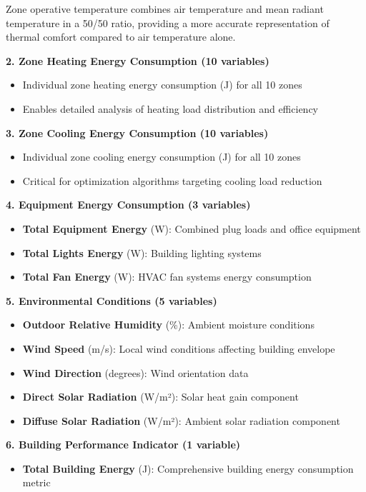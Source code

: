 \documentclass[12pt,a4paper]{article}
\begin{document}
Zone operative temperature combines air temperature and mean radiant temperature in a 50/50 ratio, providing a more accurate representation of thermal comfort compared to air temperature alone.

\textbf{2. Zone Heating Energy Consumption (10 variables)}
\begin{itemize}
    \item Individual zone heating energy consumption (J) for all 10 zones
    \item Enables detailed analysis of heating load distribution and efficiency
\end{itemize}

\textbf{3. Zone Cooling Energy Consumption (10 variables)}
\begin{itemize}
    \item Individual zone cooling energy consumption (J) for all 10 zones
    \item Critical for optimization algorithms targeting cooling load reduction
\end{itemize}

\textbf{4. Equipment Energy Consumption (3 variables)}
\begin{itemize}
    \item \textbf{Total Equipment Energy} (W): Combined plug loads and office equipment
    \item \textbf{Total Lights Energy} (W): Building lighting systems
    \item \textbf{Total Fan Energy} (W): HVAC fan systems energy consumption
\end{itemize}

\textbf{5. Environmental Conditions (5 variables)}
\begin{itemize}
    \item \textbf{Outdoor Relative Humidity} (\%): Ambient moisture conditions
    \item \textbf{Wind Speed} (m/s): Local wind conditions affecting building envelope
    \item \textbf{Wind Direction} (degrees): Wind orientation data
    \item \textbf{Direct Solar Radiation} (W/m²): Solar heat gain component
    \item \textbf{Diffuse Solar Radiation} (W/m²): Ambient solar radiation component
\end{itemize}

\textbf{6. Building Performance Indicator (1 variable)}
\begin{itemize}
    \item \textbf{Total Building Energy} (J): Comprehensive building energy consumption metric
\end{itemize}
\end{document}
